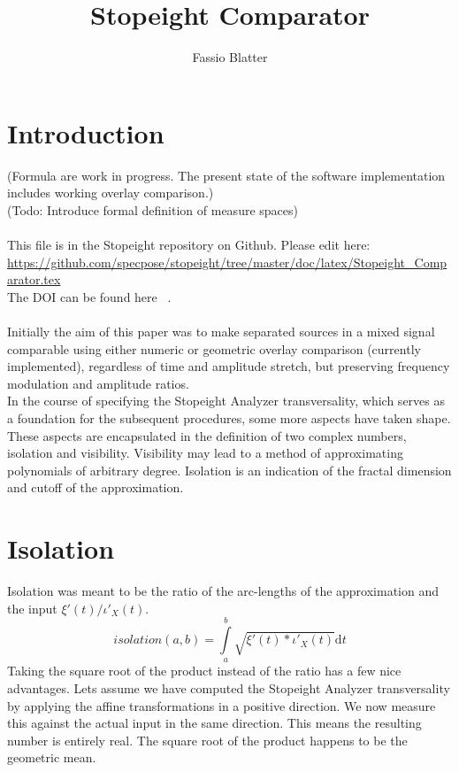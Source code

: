 \documentclass{report}
\begin{document}
\title{Stopeight Comparator}
\author{Fassio Blatter}
\maketitle

\chapter{Introduction}
(Formula are work in progress. The present state of the software implementation includes working overlay comparison.)\\
(Todo: Introduce formal definition of measure spaces)\\\\
This file is in the Stopeight repository on Github. Please edit here:\\
\href{https://github.com/specpose/stopeight/tree/master/doc/latex/Stopeight\_Comparator.tex}{https://github.com/specpose/stopeight/tree/master/doc/latex/Stopeight\_Comparator.tex}\\
The DOI can be found here ~\cite{Stopeight}.\\\\
Initially the aim of this paper was to make separated sources in a mixed signal comparable using either numeric or geometric overlay comparison (currently implemented), regardless of time and amplitude stretch, but preserving frequency modulation and amplitude ratios.\\
In the course of specifying the Stopeight Analyzer transversality, which serves as a foundation for the subsequent procedures, some more aspects have taken shape. These aspects are encapsulated in the definition of two complex numbers, isolation and visibility. Visibility may lead to a method of approximating polynomials of arbitrary degree. Isolation is an indication of the fractal dimension and cutoff of the approximation.

\chapter{Isolation}
Isolation was meant to be the ratio of the arc-lengths of the approximation and the input $\xi'(t)/\iota'_{X}(t)$.
\begin{equation}
isolation(a,b)=\int \limits _{a}^{b} \sqrt{\xi'(t)*\iota'_{X}(t)} \mathrm{d}t
\end{equation}
Taking the square root of the product instead of the ratio has a few nice advantages. Lets assume we have computed the Stopeight Analyzer transversality by applying the affine transformations in a positive direction. We now measure this against the actual input in the same direction. This means the resulting number is entirely real. The square root of the product happens to be the geometric mean.
\end{document}
